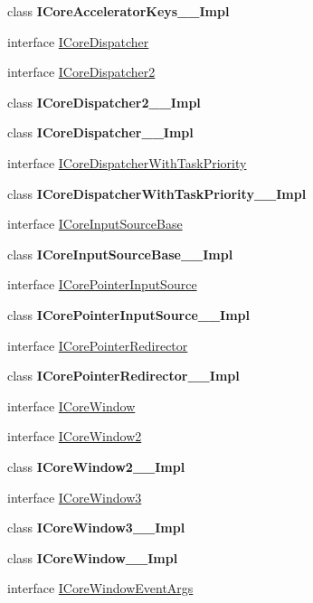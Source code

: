 \begin{DoxyCompactItemize}
\item 
class {\bfseries I\+Core\+Accelerator\+Keys\+\_\+\+\_\+\+Impl}
\item 
interface \hyperlink{interface_windows_1_1_u_i_1_1_core_1_1_i_core_dispatcher}{I\+Core\+Dispatcher}
\item 
interface \hyperlink{interface_windows_1_1_u_i_1_1_core_1_1_i_core_dispatcher2}{I\+Core\+Dispatcher2}
\item 
class {\bfseries I\+Core\+Dispatcher2\+\_\+\+\_\+\+Impl}
\item 
class {\bfseries I\+Core\+Dispatcher\+\_\+\+\_\+\+Impl}
\item 
interface \hyperlink{interface_windows_1_1_u_i_1_1_core_1_1_i_core_dispatcher_with_task_priority}{I\+Core\+Dispatcher\+With\+Task\+Priority}
\item 
class {\bfseries I\+Core\+Dispatcher\+With\+Task\+Priority\+\_\+\+\_\+\+Impl}
\item 
interface \hyperlink{interface_windows_1_1_u_i_1_1_core_1_1_i_core_input_source_base}{I\+Core\+Input\+Source\+Base}
\item 
class {\bfseries I\+Core\+Input\+Source\+Base\+\_\+\+\_\+\+Impl}
\item 
interface \hyperlink{interface_windows_1_1_u_i_1_1_core_1_1_i_core_pointer_input_source}{I\+Core\+Pointer\+Input\+Source}
\item 
class {\bfseries I\+Core\+Pointer\+Input\+Source\+\_\+\+\_\+\+Impl}
\item 
interface \hyperlink{interface_windows_1_1_u_i_1_1_core_1_1_i_core_pointer_redirector}{I\+Core\+Pointer\+Redirector}
\item 
class {\bfseries I\+Core\+Pointer\+Redirector\+\_\+\+\_\+\+Impl}
\item 
interface \hyperlink{interface_windows_1_1_u_i_1_1_core_1_1_i_core_window}{I\+Core\+Window}
\item 
interface \hyperlink{interface_windows_1_1_u_i_1_1_core_1_1_i_core_window2}{I\+Core\+Window2}
\item 
class {\bfseries I\+Core\+Window2\+\_\+\+\_\+\+Impl}
\item 
interface \hyperlink{interface_windows_1_1_u_i_1_1_core_1_1_i_core_window3}{I\+Core\+Window3}
\item 
class {\bfseries I\+Core\+Window3\+\_\+\+\_\+\+Impl}
\item 
class {\bfseries I\+Core\+Window\+\_\+\+\_\+\+Impl}
\item 
interface \hyperlink{interface_windows_1_1_u_i_1_1_core_1_1_i_core_window_event_args}{I\+Core\+Window\+Event\+Args}

\end{DoxyCompactItemize}
